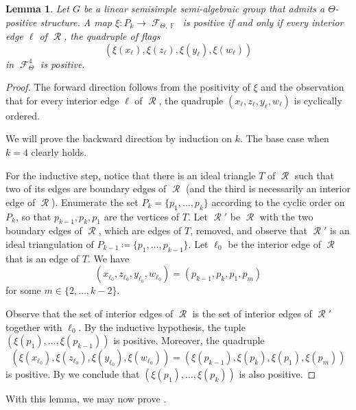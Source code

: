 \documentclass{amsart}
\theoremstyle{plain}
\newtheorem{lemma}[proposition]{Lemma}
\theoremstyle{definition}
\DeclareMathOperator{\Fc}{\mathcal{F}}
\DeclareMathOperator{\Rc}{\mathcal{R}}
\DeclareMathOperator{\Fb}{{\mathbb{F}}}
\newcommand{\1}{\mathbf{1}}
\begin{document}
\begin{lemma}\label{finite lemma}
Let $G$ be a linear semisimple semi-algebraic group that admits a $\Theta$-positive structure.
A map $\xi \colon P_k\to\Fc_{\Theta,\Fb}$ is positive if and only if every interior edge $\ell$ of $\Rc$, the quadruple of flags
\[(\xi(x_\ell),\xi(z_\ell),\xi(y_\ell),\xi(w_\ell))\]
in $\Fc_\Theta^4$ is positive.
\end{lemma}
\begin{proof}
The forward direction follows from the positivity of $\xi$ and the observation that for every interior edge $\ell$ of $\Rc$, the quadruple $(x_\ell,z_\ell,y_\ell,w_\ell)$ is cyclically ordered.

We will prove the backward direction by induction on $k$. The base case when $k=4$ clearly holds. 

For the inductive step, notice that there is an ideal triangle $T$ of $\Rc$ such that two of its edges are boundary edges of $\Rc$ (and the third is necessarily an interior edge of $\Rc$). Enumerate the set $P_k=\{p_1,\dots,p_k\}$ according to the cyclic order on $P_k$, so that $p_{k-1},p_k,p_1$ are the vertices of $T$.
Let $\Rc'$ be $\Rc$ with the two boundary edges of $\Rc$, which are edges of $T$, removed, and observe that $\Rc'$ is an ideal triangulation of $P_{k-1}\coloneqq\{p_1,\dots,p_{k-1}\}$. Let $\ell_0$ be the interior edge of $\Rc$ that is an edge of $T$. We have 
\[(x_{\ell_0},z_{\ell_0}, y_{\ell_0}, w_{\ell_0})= (p_{k-1}, p_k, p_1, p_m)\]
for some $m\in \{2,\ldots, k-2\}$. 

Observe that the set of interior edges of $\Rc$ is the set of interior edges of $\Rc'$ together with $\ell_0$. By the inductive hypothesis, the tuple $(\xi(p_1),\dots,\xi(p_{k-1}))$ is positive. Moreover, the quadruple \[(\xi(x_{\ell_0}),\xi(z_{\ell_0}),\xi(y_{\ell_0}),\xi(w_{\ell_0})) = (\xi(p_{k-1}), \xi(p_k), \xi(p_1), \xi(p_m))\]
is positive. By  we conclude that $(\xi(p_1),\dots,\xi(p_k))$ is also positive.
\end{proof}

With this lemma, we may now prove .
 
\end{document}
